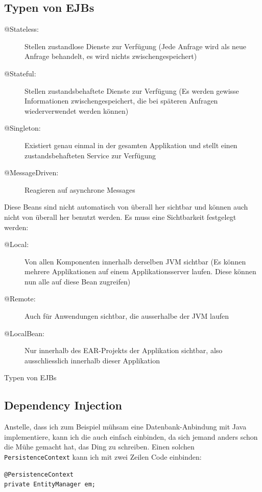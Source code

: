 \documentclass[a4paper, 11pt]{article}
\begin{document}
\subsection{Typen von EJBs}
\begin{description}
    \item[@Stateless: ] Stellen zustandlose Dienste zur Verfügung (Jede Anfrage wird als neue Anfrage behandelt, es wird nichts zwischengespeichert)
    \item[@Stateful: ] Stellen zustandsbehaftete Dienste zur Verfügung (Es werden gewisse Informationen zwischengespeichert, die bei späteren Anfragen wiederverwendet werden können)
    \item[@Singleton: ] Existiert genau einmal in der gesamten Applikation und stellt einen zustandsbehafteten Service zur Verfügung
    \item[@MessageDriven: ] Reagieren auf asynchrone Messages
\end{description}

Diese Beans sind nicht automatisch von überall her sichtbar und können auch nicht von überall her benutzt werden. Es muss eine Sichtbarkeit festgelegt werden:

\begin{description}
    \item[@Local: ] Von allen Komponenten innerhalb derselben JVM sichtbar (Es können mehrere Applikationen auf einem Applikationsserver laufen. Diese können nun alle auf diese Bean zugreifen)
    \item[@Remote: ] Auch für Anwendungen sichtbar, die ausserhalbe der JVM laufen
    \item[@LocalBean: ] Nur innerhalb des EAR-Projekts der Applikation sichtbar, also ausschliesslich innerhalb dieser Applikation
\end{description}
Typen von EJBs


\subsection{Dependency Injection}

Anstelle, dass ich zum Beispiel mühsam eine Datenbank-Anbindung mit Java implementiere, kann ich die auch einfach einbinden, da sich jemand anders schon die Mühe gemacht hat, das Ding zu schreiben. Einen solchen \texttt{PersistenceContext} kann ich mit zwei Zeilen Code einbinden:

\begin{lstlisting}
@PersistenceContext
private EntityManager em;
\end{lstlisting}
\end{document}
